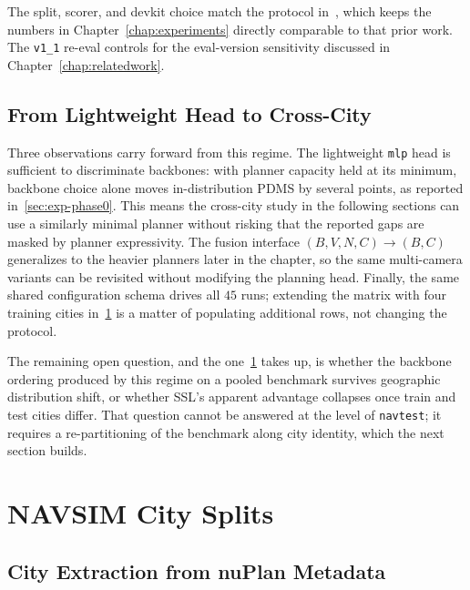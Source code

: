 The split, scorer, and devkit choice match the protocol in~\cite{naeinian-cross-city-2026}, which keeps the numbers in Chapter~\ref{chap:experiments} directly comparable to that prior work. The \texttt{v1\_1} re-eval controls for the eval-version sensitivity discussed in Chapter~\ref{chap:relatedwork}.

\subsection{From Lightweight Head to Cross-City}
\label{sec:meth-lh-bridge}

Three observations carry forward from this regime. The lightweight \texttt{mlp} head is sufficient to discriminate backbones: with planner capacity held at its minimum, backbone choice alone moves in-distribution PDMS by several points, as reported in~\ref{sec:exp-phase0}. This means the cross-city study in the following sections can use a similarly minimal planner without risking that the reported gaps are masked by planner expressivity. The fusion interface $(B, V, N, C) \to (B, C)$ generalizes to the heavier planners later in the chapter, so the same multi-camera variants can be revisited without modifying the planning head. Finally, the same shared configuration schema drives all $45$ runs; extending the matrix with four training cities in~\ref{sec:meth-city-splits} is a matter of populating additional rows, not changing the protocol.

The remaining open question, and the one~\ref{sec:meth-city-splits} takes up, is whether the backbone ordering produced by this regime on a pooled benchmark survives geographic distribution shift, or whether SSL's apparent advantage collapses once train and test cities differ. That question cannot be answered at the level of \texttt{navtest}; it requires a re-partitioning of the benchmark along city identity, which the next section builds.

\section{NAVSIM City Splits}
\label{sec:meth-city-splits}

\subsection{City Extraction from nuPlan Metadata}
\label{sec:meth-city-extraction}

